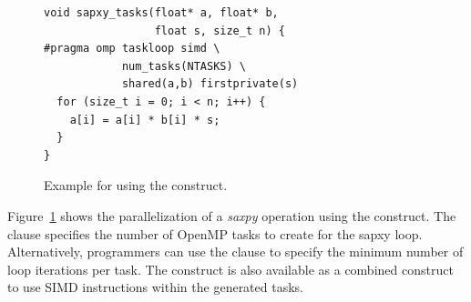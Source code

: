 \begin{figure}
\begin{verbatim}
void sapxy_tasks(float* a, float* b,
                 float s, size_t n) {
#pragma omp taskloop simd \
            num_tasks(NTASKS) \
            shared(a,b) firstprivate(s)
  for (size_t i = 0; i < n; i++) {
    a[i] = a[i] * b[i] * s;
  }
}
\end{verbatim}
\caption{Example for using the  construct.\label{fig:TaskloopExample}}
\end{figure}

Figure~\ref{fig:TaskloopExample} shows the parallelization of a \emph{saxpy} operation using the  construct.
The  clause specifies the number of OpenMP tasks to create for the sapxy loop.
Alternatively, programmers can use the \code{grainsize} clause to specify the minimum number of loop iterations per task.
The \code{taskloop} construct is also available as a combined construct to use SIMD instructions within the generated tasks.
